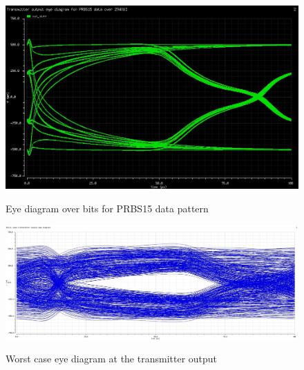 \begin{figure}[H]
  \centering
  {\includegraphics[scale=0.6]{img/prbs_eye.jpg}}
  \caption{Eye diagram over \unit[2940]{bits} for PRBS15 data pattern}
  \label{fig:eye_prbs15}
\end{figure}

\begin{figure}[H]
  \centering
  {\includegraphics[scale=0.35]{img/wc_eye_tx.jpg}}
  \caption{Worst case eye diagram at the transmitter output}
  \label{fig:wc_eye}
\end{figure}
